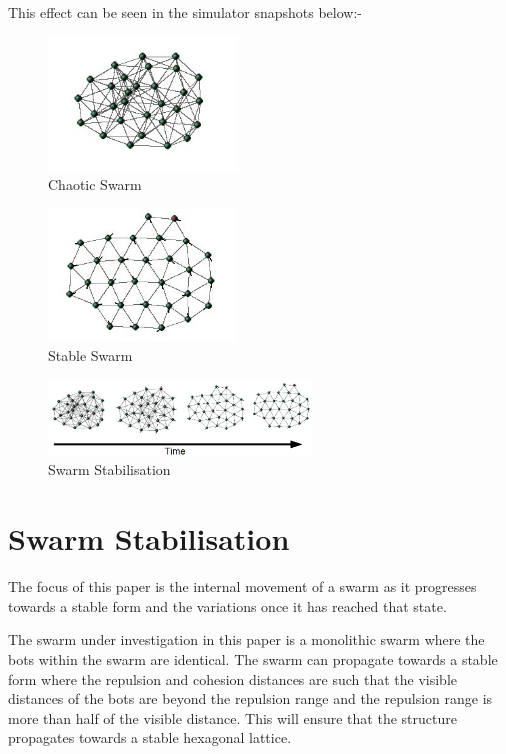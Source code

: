 \documentclass[10pt,journal,letterpaper,twoside]{IEEEtran}
\newcommand{\stability}{internal movement}
\begin{document}
This effect can be seen in the simulator snapshots below:-

\begin{figure}[H]
\begin{center}
\includegraphics[width=5cm]{figures/Chaos}
\end{center}
\caption{Chaotic Swarm\label{methods:Chaos1}}
\end{figure}
\begin{figure}[H]
\begin{center}
\includegraphics[width=5cm]{figures/Stable}
\end{center}
\caption{Stable Swarm\label{methods:Stable1}}
\end{figure}
\begin{figure}[H]
\begin{center}
\includegraphics[width=7cm]{figures/StableTime}
\end{center}
\caption{Swarm Stabilisation\label{methods:StableTime1}}
\end{figure}

\section{Swarm Stabilisation\label{section:swarmStabilisation}}
The focus of this paper is the \stability{} of a swarm as it
progresses towards a stable form and the variations once it has
reached that state.

The swarm under investigation in this paper is a monolithic swarm
where the bots within the swarm are identical. The swarm can propagate
towards a stable form where the repulsion and cohesion distances are
such that the visible distances of the bots are beyond the repulsion
range and the repulsion range is more than half of the visible
distance. This will ensure that the structure propagates towards a
stable hexagonal lattice.
\end{document}
